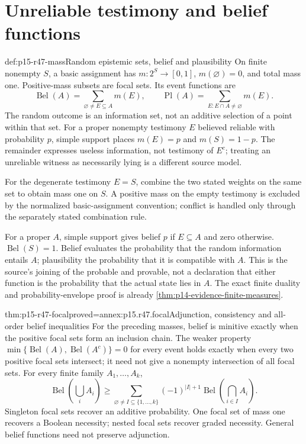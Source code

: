 \section{Unreliable testimony and belief functions}
\label{sec:p15-r47-evidence}

\begin{hbdefinition}{def:p15-r47-mass}{Random epistemic sets, belief and plausibility}
On finite nonempty \(S\), a basic assignment has
\(m:2^S\to[0,1]\), \(m(\varnothing)=0\), and total mass one.
Positive-mass subsets are focal sets. Its event functions are
\[
 \operatorname{Bel}(A)=\sum_{\varnothing\ne E\subseteq A}m(E),\qquad
 \operatorname{Pl}(A)=\sum_{E:E\cap A\ne\varnothing}m(E).
\]
The random outcome is an information set, not an additive selection of a
point within that set. For a proper nonempty testimony \(E\) believed
reliable with probability \(p\), simple support places \(m(E)=p\) and
\(m(S)=1-p\). The remainder expresses useless information, not testimony
of \(E^c\); treating an unreliable witness as necessarily lying is a
different source model.
\end{hbdefinition}

For the degenerate testimony \(E=S\), combine the two stated weights on
the same set to obtain mass one on \(S\). A positive mass on the empty
testimony is excluded by the normalized basic-assignment convention;
conflict is handled only through the separately stated combination rule.

For a proper \(A\), simple support gives belief \(p\) if \(E\subseteq A\)
and zero otherwise. \(\operatorname{Bel}(S)=1\). Belief evaluates the
probability that the random information entails \(A\); plausibility the
probability that it is compatible with \(A\). This is the source's joining
of the probable and provable, not a declaration that either function is
the probability that the actual state lies in \(A\). The exact finite
duality and probability-envelope proof is already
\cref{thm:p14-evidence-finite-measures}.

\begin{hbtheorem}{thm:p15-r47-focal}{proved=annex:p15.r47.focal}{Adjunction, consistency and all-order belief inequalities}
For the preceding masses, belief is minitive exactly when the positive
focal sets form an inclusion chain. The weaker property
\(\min\{\operatorname{Bel}(A),\operatorname{Bel}(A^c)\}=0\) for every event
holds exactly when every two positive focal sets intersect; it need not
give a nonempty intersection of all focal sets. For every finite family
\(A_1,\ldots,A_k\),
\[
 \operatorname{Bel}\left(\bigcup_i A_i\right)\geq
 \sum_{\varnothing\ne I\subseteq\{1,\ldots,k\}}
       (-1)^{|I|+1}\operatorname{Bel}\left(\bigcap_{i\in I}A_i\right).
\]
Singleton focal sets recover an additive probability. One focal set of
mass one recovers a Boolean necessity; nested focal sets recover graded
necessity. General belief functions need not preserve adjunction.
\end{hbtheorem}

